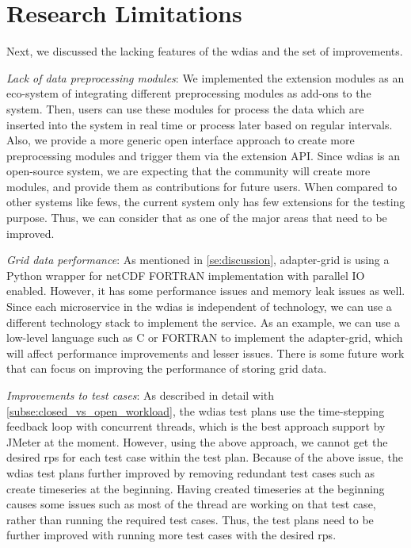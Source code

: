 \section{Research Limitations}
\label{se:research_limitations}

Next, we discussed the lacking features of the \acrshort{wdias} and the set of improvements.

\emph{Lack of data preprocessing modules}:
We implemented the extension modules as an eco-system of integrating different preprocessing modules as add-ons to the system. Then, users can use these modules for process the data which are inserted into the system in real time or process later based on regular intervals. Also, we provide a more generic open interface approach to create more preprocessing modules and trigger them via the extension API. Since \acrshort{wdias} is an open-source system, we are expecting that the community will create more modules, and provide them as contributions for future users. When compared to other systems like \acrshort{fews}, the current system only has few extensions for the testing purpose. Thus, we can consider that as one of the major areas that need to be improved.

\emph{Grid data performance}:
As mentioned in \cref{se:discussion}, adapter-grid is using a Python wrapper for netCDF FORTRAN implementation with parallel IO enabled. However, it has some performance issues and memory leak issues as well. Since each microservice in the \acrshort{wdias} is independent of technology, we can use a different technology stack to implement the service. As an example, we can use a low-level language such as C or FORTRAN to implement the adapter-grid, which will affect performance improvements and lesser issues. There is some future work that can focus on improving the performance of storing grid data.

\emph{Improvements to test cases}:
As described in detail with \cref{subse:closed_vs_open_workload}, the \acrshort{wdias} test plans use the time-stepping feedback loop with concurrent threads, which is the best approach support by JMeter at the moment. However, using the above approach, we cannot get the desired \acrshort{rps} for each test case within the test plan.
Because of the above issue, the \acrshort{wdias} test plans further improved by removing redundant test cases such as create timeseries at the beginning. Having created timeseries at the beginning causes some issues such as most of the thread are working on that test case, rather than running the required test cases. Thus, the test plans need to be further improved with running more test cases with the desired \acrshort{rps}.

